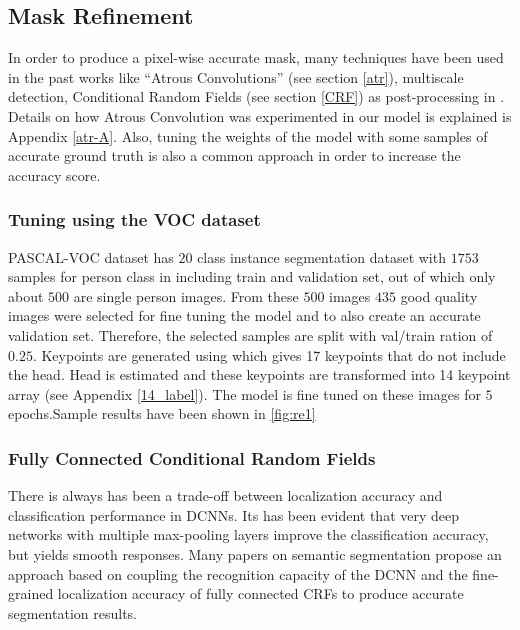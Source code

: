 \documentclass[conference]{IEEEtran}
\begin{document}
\subsection{Mask Refinement}
In order to produce a pixel-wise accurate mask, many techniques have been used in the past works like ``Atrous Convolutions'' (see section \ref{atr}), multiscale detection, Conditional Random Fields (see section \ref{CRF}) as post-processing in \cite{dpl1,dpl2}.
Details on how Atrous Convolution was experimented in our model is explained is Appendix \ref{atr-A}. Also, tuning the weights of the model with some samples of accurate ground truth is also a common approach in order to increase the accuracy score.

\subsubsection{Tuning using the VOC dataset}
PASCAL-VOC dataset has $20$ class instance segmentation dataset with $1753$ samples for person class in including train and validation set, out of which only about $500$ are single person images. From these $500$ images $435$ good quality images were selected for fine tuning the model and to also create an accurate validation set. Therefore, the selected samples are split with val/train ration of $0.25$. Keypoints are generated using \cite{poseAE} which gives 17 keypoints that do not include the head. Head is estimated and these keypoints are transformed into 14 keypoint array (see Appendix \ref{14_label}). The model is fine tuned on these images for $5$ epochs.Sample results have been shown in \ref{fig:re1}

\subsubsection{Fully Connected Conditional Random Fields}
There is always has been a trade-off between localization accuracy and classification performance in DCNNs. Its has been evident that very deep networks with multiple max-pooling layers improve the classification accuracy, but yields smooth responses. Many papers on semantic segmentation propose an approach based on coupling the recognition capacity of the DCNN and the fine-grained localization accuracy of fully connected CRFs to produce accurate segmentation results. 
\end{document}
